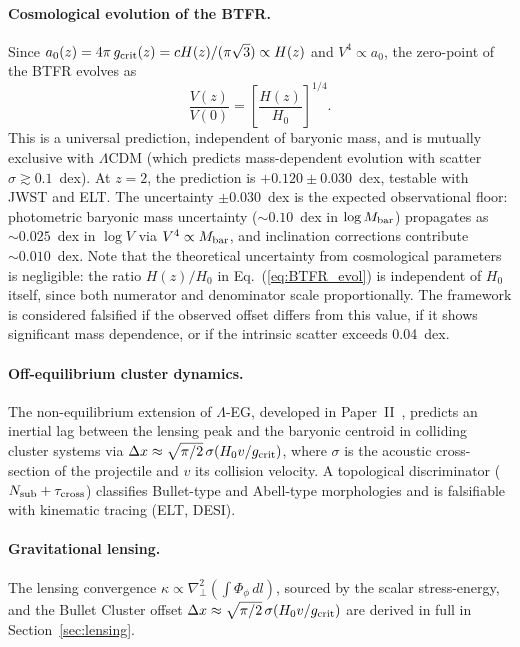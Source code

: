 \documentclass[11pt,a4paper]{article}
\begin{document}
\paragraph{Cosmological evolution of the BTFR.}
Since $a_0(z) = 4\pi\,g_{\rm crit}(z) = cH(z)/(\pi\sqrt{3})\propto H(z)$ and $V^4\propto a_0$,
the zero-point of the BTFR evolves as
\begin{equation}
  \frac{V(z)}{V(0)} = \left[\frac{H(z)}{H_0}\right]^{1/4}.
  \label{eq:BTFR_evol}
\end{equation}
This is a universal prediction, independent of baryonic mass, and is mutually exclusive
with $\Lambda$CDM (which predicts mass-dependent evolution with scatter $\sigma\gtrsim0.1$~dex).
At $z=2$, the prediction is $+0.120\pm0.030$~dex, testable with JWST and ELT.
The uncertainty $\pm0.030$~dex is the expected observational floor: photometric
baryonic mass uncertainty ($\sim0.10$~dex in $\log M_{\rm bar}$) propagates as
$\sim0.025$~dex in $\log V$ via $V^4\propto M_{\rm bar}$, and inclination
corrections contribute $\sim0.010$~dex.  Note that the theoretical uncertainty
from cosmological parameters is negligible: the ratio $H(z)/H_0$ in
Eq.~(\ref{eq:BTFR_evol}) is independent of $H_0$ itself, since both numerator
and denominator scale proportionally.
The framework is considered falsified if the observed offset differs from this value,
if it shows significant mass dependence, or if the intrinsic scatter exceeds 0.04~dex.

\paragraph{Off-equilibrium cluster dynamics.}
The non-equilibrium extension of $\Lambda$-EG, developed in Paper~II~\cite{PaperII},
predicts an inertial lag between the lensing peak and the baryonic centroid in
colliding cluster systems via $\Delta x \approx \sqrt{\pi/2}\,\sigma(H_0 v/g_{\rm crit})$, where
$\sigma$ is the acoustic cross-section of the projectile and $v$ its collision velocity.
A topological discriminator ($N_{\rm sub} + \tau_{\rm cross}$) classifies Bullet-type
and Abell-type morphologies and is falsifiable with kinematic tracing (ELT, DESI).

\paragraph{Gravitational lensing.}
The lensing convergence $\kappa\propto\nabla_\perp^2(\int\Phi_\phi\,dl)$, sourced by the
scalar stress-energy, and the Bullet Cluster offset
$\Delta x\approx\sqrt{\pi/2}\,\sigma(H_0 v/g_{\rm crit})$ are derived in full in
Section~\ref{sec:lensing}.
\end{document}
